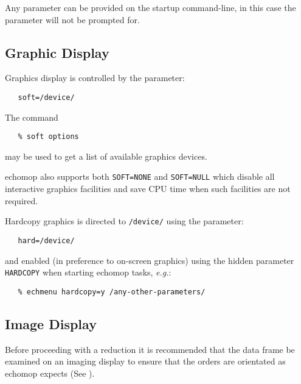 Any parameter can be provided on the startup command-line, in
this case the parameter will not be prompted for.


\subsection{Graphic Display}

Graphics display is controlled by the parameter:

\begin{verbatim}
   soft=/device/
\end{verbatim}

The   command

\begin{verbatim}
   % soft options
\end{verbatim}

may be used to get a list of available graphics devices.

{\sc echomop} also supports both \verb+SOFT=NONE+ and \verb+SOFT=NULL+
which disable all interactive graphics facilities and save CPU time when
such facilities are not required.

Hardcopy graphics is directed to {\tt /device/} using the parameter:

\begin{verbatim}
   hard=/device/
\end{verbatim}

and enabled (in preference to on-screen graphics) using the hidden
parameter \verb+HARDCOPY+ when starting {\sc echomop} tasks, {\it{e.g.}}:

\begin{verbatim}
   % echmenu hardcopy=y /any-other-parameters/
\end{verbatim}


\subsection{Image Display}

Before proceeding with a reduction it is recommended that the data frame
be examined on an imaging display to ensure that the orders are
orientated as {\sc echomop} expects (See \sunspec{\S\ref{orientation}}
{}).

